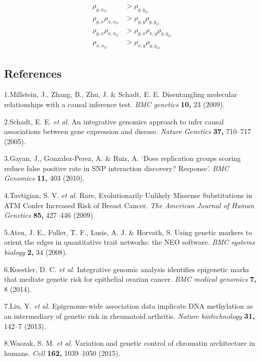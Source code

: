 \documentclass[]{article}
\begin{document}
\[
\begin{aligned}
\rho_{g, x_O} & > \rho_{g, y_O} \\
\rho_{g, x} \rho_{x, x_O} & > \rho_{g,y}\rho_{y,y_O}\\
\rho_{g, x} \rho_{x, x_O} & > \rho_{g,x}\rho_{x,y}\rho_{y,y_O}\\
\rho_{x, x_O} & > \rho_{x,y}\rho_{y,y_O}
\end{aligned}
\]

\newpage

\subsection*{References}\label{references}

1.Millstein, J., Zhang, B., Zhu, J. \& Schadt, E. E. Disentangling
molecular relationships with a causal inference test. \emph{BMC
genetics} \textbf{10,} 23 (2009).

2.Schadt, E. E. \emph{et al.} An integrative genomics approach to infer
causal associations between gene expression and disease. \emph{Nature
Genetics} \textbf{37,} 710--717 (2005).

3.Gayan, J., Gonzalez-Perez, A. \& Ruiz, A. `Does replication groups
scoring reduce false positive rate in SNP interaction discovery?
Response'. \emph{BMC Genomics} \textbf{11,} 403 (2010).

4.Tavtigian, S. V. \emph{et al.} Rare, Evolutionarily Unlikely Missense
Substitutions in ATM Confer Increased Risk of Breast Cancer. \emph{The
American Journal of Human Genetics} \textbf{85,} 427--446 (2009).

5.Aten, J. E., Fuller, T. F., Lusis, A. J. \& Horvath, S. Using genetic
markers to orient the edges in quantitative trait networks: the NEO
software. \emph{BMC systems biology} \textbf{2,} 34 (2008).

6.Koestler, D. C. \emph{et al.} Integrative genomic analysis identifies
epigenetic marks that mediate genetic risk for epithelial ovarian
cancer. \emph{BMC medical genomics} \textbf{7,} 8 (2014).

7.Liu, Y. \emph{et al.} Epigenome-wide association data implicate DNA
methylation as an intermediary of genetic risk in rheumatoid arthritis.
\emph{Nature biotechnology} \textbf{31,} 142--7 (2013).

8.Waszak, S. M. \emph{et al.} Variation and genetic control of chromatin
architecture in humans. \emph{Cell} \textbf{162,} 1039--1050 (2015).
\end{document}

